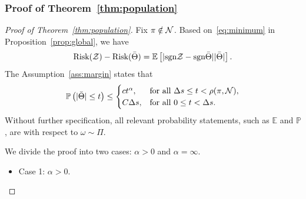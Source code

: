 \documentclass[11pt]{article}
\theoremstyle{plain}
\theoremstyle{definition}
\def\sign{\textup{sgn}}
\def\risk{\textup{Risk}}
\begin{document}
\subsubsection{Proof of Theorem~\ref{thm:population}}
\begin{proof}[Proof of Theorem~\ref{thm:population}]
Fix $\pi\notin\mathcal{N}$. Based on~\eqref{eq:minimum} in Proposition~\ref{prop:global}, we have
\begin{equation}\label{eq:population2}
\risk(\tZ)- \risk(\bar \Theta) = \mathbb{E}\left[|\sign \tZ-\sign\bar \Theta||\bar \Theta|\right].
\end{equation}
The Assumption~\ref{ass:margin} states that
\begin{align}\label{eq:ass}
\mathbb{P}\left(|\bar \Theta | \leq t\right) \leq 
\begin{cases}ct^\alpha, & \text{for all } \Delta s \leq t< \rho(\pi,\mathcal{N}),\\
C\Delta s, & \text{for all }0\leq t< \Delta s.
\end{cases}
\end{align}
Without further specification, all relevant probability statements, such as $\mathbb{E}$ and $\mathbb{P}$, are with respect to $\omega\sim \Pi$. 

We divide the proof into two cases: $\alpha >0$ and $\alpha = \infty$.
\begin{itemize}[leftmargin=*,topsep=0pt,itemsep=-1ex,partopsep=1ex,parsep=1ex]
\item Case 1: $\alpha>0$. 


\end{itemize}
\end{proof}
\end{document}
